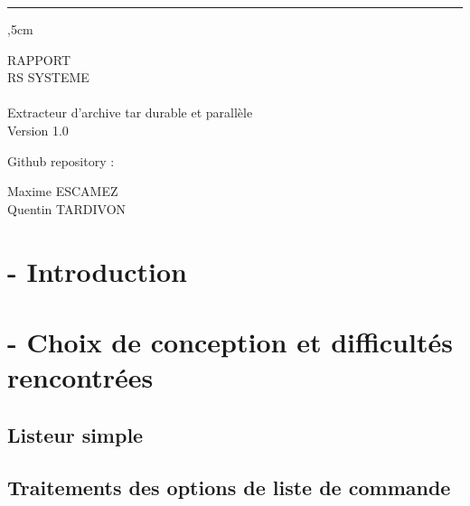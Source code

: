 \documentclass{scrreprt}
\date{}
\def\myversion{1.0 }
\begin{document}
%
\thispagestyle{empty}
\begin{flushright}
    \rule{15cm}{3pt},5cm
    \begin{bfseries}
        \Huge{RAPPORT \\ RS SYSTEME}\\
        \vspace{2cm}
        \\
        \vspace{2cm}
        \Huge{Extracteur d'archive tar durable et parallèle}\\

        \vspace{0.5cm}
        \LARGE{Version \myversion}\\
        \begin{flushleft}
            \vspace{8cm}
            Github repository : \href{https://github.com/ln-projetu/rs2016-escamez-tardivon}{\faGithub}~\\
            \vspace{0.5cm}

            Maxime ESCAMEZ\\
            Quentin TARDIVON\\
        \end{flushleft}
    \end{bfseries}
\end{flushright}

\tableofcontents

\setcounter{page}{0}

\chapter{- Introduction}

{\let\clearpage\relax \chapter{- Choix de conception et difficultés rencontrées}}

\section{Listeur simple}
\section{Traitements des options de liste de commande}
\end{document}
